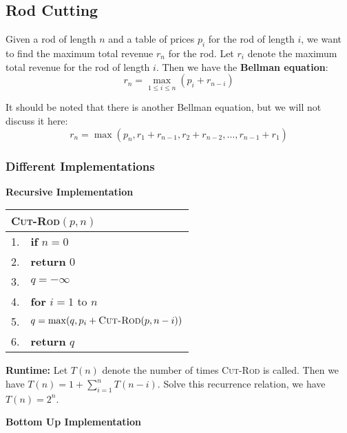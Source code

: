\documentclass[a4paper,12pt]{article}
\begin{document}
\subsection{Rod Cutting}

Given a rod of length $n$ and a table of prices $p_i$ for the rod of length $i$, we want to find the maximum total revenue $r_n$ for the rod.
Let $r_i$ denote the maximum total revenue for the rod of length $i$.
Then we have the \textbf{Bellman equation}:
\begin{equation*}
	r_n = \max_{1 \leq i \leq n} (p_i + r_{n - i})
\end{equation*}

It should be noted that there is another Bellman equation, but we will not discuss it here:
\begin{equation*}
	r_n = \max (p_n, r_1 + r_{n - 1}, r_2 + r_{n - 2}, \dots, r_{n - 1} + r_1)
\end{equation*}

\subsubsection{Different Implementations}

\textbf{Recursive Implementation}

\begin{center}
	\begin{tabular}{rl}
		\toprule
		\multicolumn{2}{l}{\textsc{Cut-Rod}$(p, n)$} \\
		\midrule
		1. & \textbf{if} $n = 0$ \\
		2. & \quad \textbf{return} $0$ \\
		3. & $q = -\infty$ \\
		4. & \textbf{for} $i = 1$ to $n$ \\
		5. & \quad $q = \max(q, p_i + \textsc{Cut-Rod}(p, n - i))$ \\
		6. & \textbf{return} $q$ \\
		\bottomrule
	\end{tabular}
\end{center}

\textbf{Runtime:}
Let $T(n)$ denote the number of times \textsc{Cut-Rod} is called.
Then we have $T(n) = 1 + \sum_{i = 1}^{n} T(n - i)$.
Solve this recurrence relation, we have $T(n) = 2^n$.

\textbf{Bottom Up Implementation}
\end{document}
